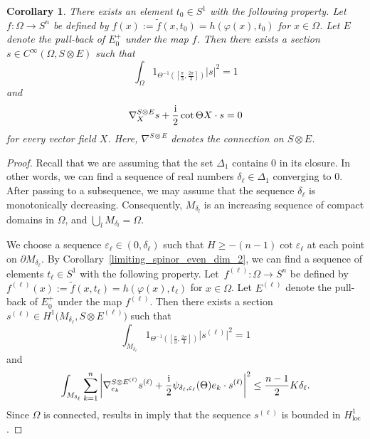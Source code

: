 \documentclass[pdftex]{sigma}
\numberwithin{equation}{section}
\newtheorem{Corollary}[Theorem]{Corollary}
\begin{document}
\begin{Corollary}
\label{special_spinor_on_Omega}
There exists an element $t_0 \in S^1$ with the following property.
Let $f\colon \Omega \to S^n$ be defined by $f(x) := \tilde{f}(x,t_0) = h(\varphi(x),t_0)$ for $x \in \Omega$.
Let $E$ denote the pull-back of $E_0^+$ under the map $f$.
Then there exists a section $s \in C^\infty(\Omega,S \otimes E)$ such that
\[\int_\Omega 1_{\Theta^{-1}([\frac{\pi}{3},\frac{2\pi}{3}])} |s|^2 = 1\]
and
\[\nabla_X^{S \otimes E} s + \frac{\rm i}{2} \cot \Theta X \cdot s = 0\]
for every vector field $X$.
Here, $\nabla^{S \otimes E}$ denotes the connection on $S \otimes E$.
\end{Corollary}

\begin{proof}
Recall that we are assuming that the set $\Delta_1$ contains $0$ in its closure. In other words, we can find a sequence of real numbers $\delta_\ell \in \Delta_1$ converging to $0$.
After passing to a subsequence, we may assume that the sequence $\delta_\ell$ is monotonically decreasing.
Consequently, $M_{\delta_l}$ is an increasing sequence of compact domains in $\Omega$, and $\bigcup_l M_{\delta_l} = \Omega$.

We choose a sequence $\varepsilon_\ell \in (0,\delta_\ell)$ such that $H \geq -(n-1) \cot \varepsilon_\ell$ at each point on $\partial M_{\delta_\ell}$.
By Corollary~\ref{limiting_spinor_even_dim_2}, we can find a sequence of elements $t_\ell \in S^1$ with the following property.
Let~${f^{(\ell)}\colon \Omega \to S^n}$ be defined by $f^{(\ell)}(x) := \tilde{f}(x,t_\ell) = h(\varphi(x),t_\ell)$ for $x \in \Omega$.
Let $E^{(\ell)}$ denote the pull-back of $E_0^+$ under the map $f^{(\ell)}$.
Then there exists a section $s^{(\ell)} \in H^1\big(M_{\delta_\ell},S \otimes E^{(\ell)}\big)$ such that
\[
 \int_{M_{\delta_\ell}} 1_{\Theta^{-1}([\frac{\pi}{3},\frac{2\pi}{3}])} \big|s^{(\ell)}\big|^2 = 1
 \]
and
\[
 \int_{M_{\delta_\ell}} \sum_{k=1}^n \left| \nabla_{e_k}^{S \otimes E^{(\ell)}} s^{(\ell)} + \frac{\rm i}{2} \psi_{\delta_\ell,\varepsilon_\ell}(\Theta) e_k \cdot s^{(\ell)} \right|^2 \leq \frac{n-1}{2} K\delta_\ell.
 \]
Since $\Omega$ is connected, results in \cite{Baer-Brendle-Chow-Hanke} imply that the sequence $s^{(\ell)}$ is bounded in $H_{\mathrm{loc}}^1$.


\end{proof}
\end{document}
